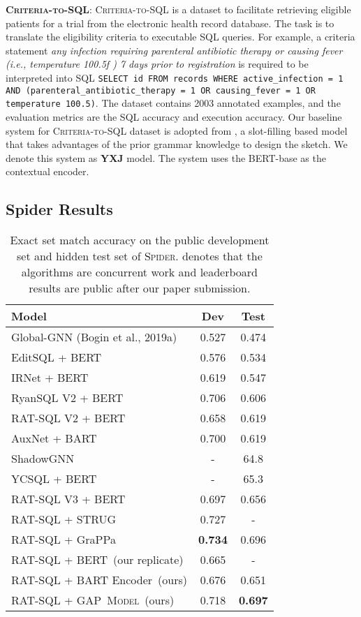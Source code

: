 \documentclass[letterpaper]{article} \usepackage{aaai21}  \usepackage{times}  \usepackage{helvet} \usepackage{courier}  \usepackage[hyphens]{url}  \usepackage{graphicx} \usepackage{booktabs}
\newcommand{\modelnamelm}{\textsc{GAP~Model}}
\begin{document}
\smallskip \noindent \textbf{\textsc{Criteria-to-SQL}}: \textsc{Criteria-to-SQL} is a dataset to facilitate retrieving eligible patients for a trial from the electronic health record database.
The task is to translate the eligibility criteria to executable SQL queries.
For example, a criteria statement \textit{any infection requiring parenteral antibiotic therapy or causing fever (i.e., temperature  100.5f )  7 days prior to registration} is required to be interpreted into SQL \texttt{SELECT id FROM records WHERE active\_infection = 1 AND (parenteral\_antibiotic\_therapy = 1 OR causing\_fever = 1 OR temperature  100.5)}.
The dataset contains 2003 annotated examples, and the evaluation metrics are the SQL accuracy and execution accuracy.
Our baseline system for \textsc{Criteria-to-SQL} dataset is adopted from \cite{yu2020dataset}, a slot-filling based model that takes advantages of the prior grammar knowledge to design the sketch.
We denote this system as \textbf{YXJ} model.
The system uses the BERT-base as the contextual encoder.


\subsection{Spider Results}

\begin{table}[t]
  \centering
  \small
    \begin{tabular}{lcc}
    \toprule
    Model & Dev & Test \\
    \midrule
    Global-GNN (Bogin et al., 2019a) & 0.527 & 0.474 \\
    EditSQL + BERT~\cite{zhang19} & 0.576 & 0.534  \\
    IRNet + BERT~\cite{guo2019towards} & 0.619 & 0.547  \\
    RyanSQL V2 + BERT~\cite{Choi2020RYANSQLRA} & 0.706 & 0.606 \\
    RAT-SQL V2 + BERT~\cite{wang2019rat} & 0.658 & 0.619 \\
    AuxNet + BART & 0.700 & 0.619 \\
    ShadowGNN & - & 64.8 \\
    YCSQL + BERT & - & 65.3 \\
    RAT-SQL V3 + BERT~\cite{wang2019rat} & 0.697 & 0.656  \\
    RAT-SQL + STRUG~\cite{deng2020structure} & 0.727 & - \\
    RAT-SQL + GraPPa~\cite{yu2020grappa} & \textbf{0.734} & 0.696 \\
    \midrule
    RAT-SQL + BERT~(our replicate) & 0.665 & -  \\
    RAT-SQL + BART Encoder~(ours) & 0.676 & 0.651  \\
    RAT-SQL + \modelnamelm~(ours) & 0.718 & \textbf{0.697}\\
    \bottomrule
    \end{tabular}\caption{Exact set match accuracy on the public development set and hidden test set of \textsc{Spider}. {\dag} denotes that the algorithms are concurrent work and leaderboard results are public after our paper submission.}
  \label{tab:spider}\end{table}
\end{document}

